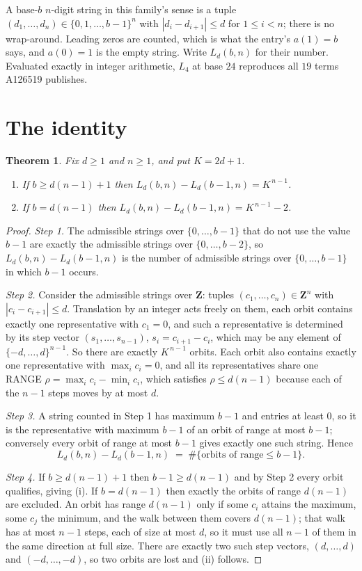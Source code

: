 \documentclass[11pt,a4paper]{article}
\theoremstyle{plain}
\newtheorem{theorem}{Theorem}
\theoremstyle{definition}
\begin{document}
A base-$b$ $n$-digit string in this family's sense is a tuple
$(d_1,\dots,d_n)\in\{0,1,\dots,b-1\}^{n}$ with $|d_i-d_{i+1}|\le d$ for $1\le i<n$; there
is no wrap-around. Leading zeros are counted, which is what the entry's $a(1)=b$ says, and
$a(0)=1$ is the empty string. Write $L_d(b,n)$ for their number. Evaluated exactly in integer
arithmetic, $L_{4}$ at base $24$ reproduces all $19$ terms A126519 publishes.

\section{The identity}

\begin{theorem}
Fix $d\ge1$ and $n\ge1$, and put $K=2d+1$.
\begin{enumerate}
\item[(i)] If $b\ge d(n-1)+1$ then $L_d(b,n)-L_d(b-1,n)=K^{\,n-1}$.
\item[(ii)] If $b=d(n-1)$ then $L_d(b,n)-L_d(b-1,n)=K^{\,n-1}-2$.
\end{enumerate}
\end{theorem}

\begin{proof}
\emph{Step 1.} The admissible strings over $\{0,\dots,b-1\}$ that do not use the value $b-1$
are exactly the admissible strings over $\{0,\dots,b-2\}$, so $L_d(b,n)-L_d(b-1,n)$ is the
number of admissible strings over $\{0,\dots,b-1\}$ in which $b-1$ occurs.

\emph{Step 2.} Consider the admissible strings over $\mathbf{Z}$: tuples
$(c_1,\dots,c_n)\in\mathbf{Z}^{n}$ with $|c_i-c_{i+1}|\le d$. Translation by an integer acts
freely on them, each orbit contains exactly one representative with $c_1=0$, and such a
representative is determined by its step vector $(s_1,\dots,s_{n-1})$, $s_i=c_{i+1}-c_i$,
which may be any element of $\{-d,\dots,d\}^{n-1}$. So there are exactly $K^{\,n-1}$ orbits.
Each orbit also contains exactly one representative with $\max_i c_i=0$, and all its
representatives share one RANGE $\rho=\max_ic_i-\min_ic_i$, which satisfies
$\rho\le d(n-1)$ because each of the $n-1$ steps moves by at most $d$.

\emph{Step 3.} A string counted in Step 1 has maximum $b-1$ and entries at least $0$, so it is
the representative with maximum $b-1$ of an orbit of range at most $b-1$; conversely every orbit
of range at most $b-1$ gives exactly one such string. Hence
\[
L_d(b,n)-L_d(b-1,n)\;=\;\#\{\text{orbits of range}\le b-1\} .
\]

\emph{Step 4.} If $b\ge d(n-1)+1$ then $b-1\ge d(n-1)$ and by Step 2 every orbit qualifies,
giving (i). If $b=d(n-1)$ then exactly the orbits of range $d(n-1)$ are excluded. An orbit has
range $d(n-1)$ only if some $c_i$ attains the maximum, some $c_j$ the minimum, and the walk
between them covers $d(n-1)$; that walk has at most $n-1$ steps, each of size at most $d$, so it
must use all $n-1$ of them in the same direction at full size. There are exactly two such step
vectors, $(d,\dots,d)$ and $(-d,\dots,-d)$, so two orbits are lost and (ii) follows.
\end{proof}
\end{document}

